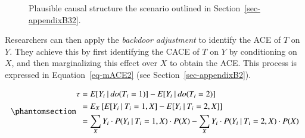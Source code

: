 \documentclass[
  authoryear,
  review,
  1p]{elsarticle}
\begin{document}
\begin{figure}

\begin{minipage}{0.50\linewidth}

\centering{

\[
\begin{aligned}
  X & := f_{X}(e_{X}) \\
  T & := t \\
  Y & := f_{Y}(t,X,e_{Y}) \\
  e_{T} & \:\bot\:e_{X} \\
  e_{T} & \:\bot\:e_{Y} \\
  e_{X} & \:\bot\:e_{Y}
\end{aligned}
\]

}


\end{minipage}%
%
\begin{minipage}{0.50\linewidth}



\end{minipage}%

\caption{\label{fig-example3}Plausible causal structure the scenario
outlined in Section~\ref{sec-appendixB32}.}

\end{figure}%

Researchers can then apply the \emph{backdoor adjustment} to identify
the ACE of \(T\) on \(Y\). They achieve this by first identifying the
CACE of \(T\) on \(Y\) by conditioning on \(X\), and then marginalizing
this effect over \(X\) to obtain the ACE. This process is expressed in
Equation~\ref{eq-mACE2} (see Section~\ref{sec-appendixB2}).

\begin{equation}\phantomsection\label{eq-mACE2}{
\begin{aligned}
  \tau & = E[Y_{i} \:|\:do(T_{i}=1)]- E[Y_{i} \:|\:do(T_{i}=2)] \\
  & = E_{X}\left[ E[Y_{i} \:|\:T_{i}=1, X] - E[Y_{i} \:|\:T_{i}=2, X] \right] \\
  & = \sum_{X} Y_{i} \cdot P( Y_{i} \:|\:T_{i}=1, X) \cdot P(X) - \sum_{X} Y_{i} \cdot P( Y_{i} \:|\:T_{i}=2, X) \cdot P(X)
\end{aligned}
}\end{equation}
\end{document}
